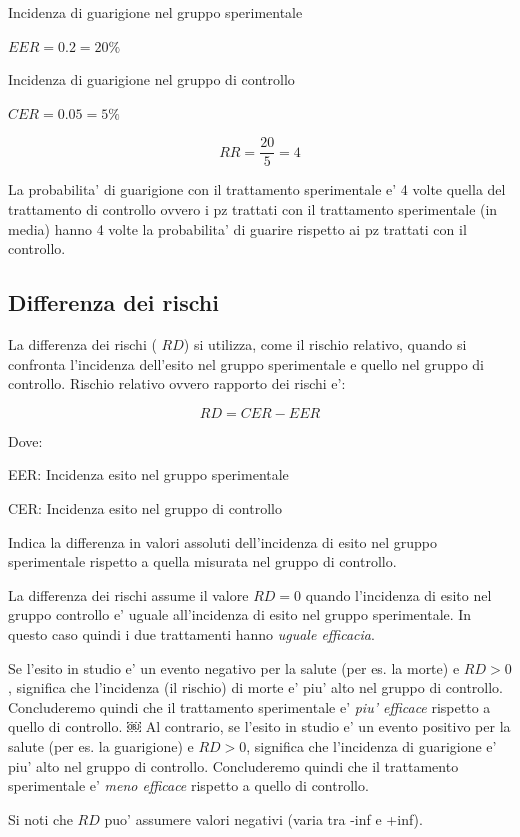 \documentclass[]{book}
\begin{document}
Incidenza di guarigione nel gruppo sperimentale

\(EER = 0.2 = 20\%\)

Incidenza di guarigione nel gruppo di controllo

\(CER= 0.05 = 5\%\)

\[RR = \frac {20}{5} = 4\]

La probabilita' di guarigione con il trattamento sperimentale e' 4 volte quella del trattamento di controllo
ovvero i pz trattati con il trattamento sperimentale (in media) hanno 4 volte la probabilita' di guarire rispetto ai pz trattati con il controllo.

\hypertarget{differenza-dei-rischi}{%
\subsection{Differenza dei rischi}\label{differenza-dei-rischi}}

La differenza dei rischi ( \(RD\)) si utilizza, come il rischio relativo, quando si confronta l'incidenza dell'esito nel gruppo sperimentale e quello nel gruppo di controllo.
Rischio relativo ovvero rapporto dei rischi e':

\[RD = { CER -EER}\]

Dove:

EER: Incidenza esito nel gruppo sperimentale

CER: Incidenza esito nel gruppo di controllo

Indica la differenza in valori assoluti dell'incidenza di esito nel gruppo sperimentale rispetto a quella misurata nel gruppo di controllo.

La differenza dei rischi assume il valore \(RD=0\) quando l'incidenza di esito nel gruppo controllo e' uguale all'incidenza di esito nel gruppo sperimentale. In questo caso quindi i due trattamenti hanno \emph{uguale efficacia}.

Se l'esito in studio e' un evento negativo per la salute (per es. la morte) e \(RD>0\), significa che l'incidenza (il rischio) di morte e' piu' alto nel gruppo di controllo. Concluderemo quindi che il trattamento sperimentale e' \emph{piu' efficace} rispetto a quello di controllo.
￼
Al contrario, se l'esito in studio e' un evento positivo per la salute (per es. la guarigione) e \(RD>0\), significa che l'incidenza di guarigione e' piu' alto nel gruppo di controllo. Concluderemo quindi che il trattamento sperimentale e' \emph{meno efficace} rispetto a quello di controllo.

Si noti che \(RD\) puo' assumere valori negativi (varia tra -inf e +inf).
\end{document}
